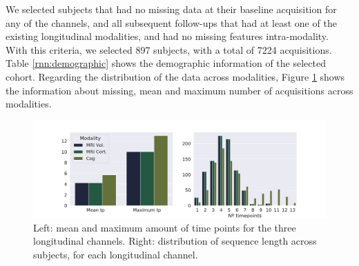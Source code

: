 We selected subjects that had no missing data at their baseline acquisition for any of the channels, and all subsequent follow-ups that had at least one of the existing longitudinal modalities, and had no missing features intra-modality. With this criteria, we selected 897 subjects, with a total of 7224 acquisitions. Table \ref{rnn:demographic} shows the demographic information of the selected cohort. Regarding the distribution of the data across modalities, Figure \ref{fig:rnn:missingdata} shows the information about missing, mean and maximum number of acquisitions across modalities.

\begin{table}[!htbp]
\centering
{}
\caption[Demographic characteristics of the cohort used, at baseline.]{Demographic characteristics of the cohort at baseline. Age and education presented as average and standard deviation, in years. APOE $\varepsilon$4: Apolipoprotein $\varepsilon$4, percentage with 1 or 2 alleles. CN: Cognitively normal. MCI: Mild cognitive impairment. AD: Alzheimer’s disease. MMSE: Mini-mental state examination. }\label{rnn:demographic}
\end{table}

\begin{figure}[!htbp]
  \centering
  \includegraphics[width=1.0\textwidth]{figures/rnnvae/rnn_long.pdf}
  \caption[Time point distribution of ADNI data.]{Left: mean and maximum amount of time points for the three longitudinal channels. Right: distribution of sequence length across subjects, for each longitudinal channel.}\label{fig:rnn:missingdata}
\end{figure}

